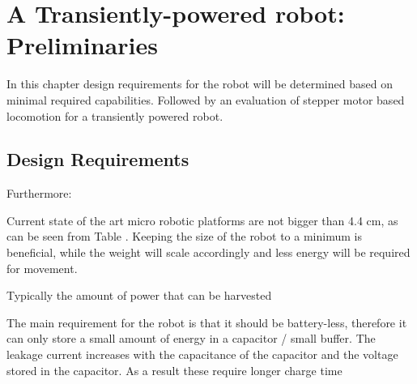 \chapter{A Transiently-powered robot: Preliminaries}

In this chapter design requirements for the robot will be determined based on minimal required capabilities. 
Followed by an evaluation of stepper motor based locomotion for a transiently powered robot.

\section{Design Requirements}
\label{sec:design_requirements}






Furthermore:



Current state of the art micro robotic platforms are not bigger than 4.4 cm, as can be seen from Table \label{tab:comparison_robot_platforms}.
Keeping the size of the robot to a minimum is beneficial, while the weight will scale accordingly and less energy will be required for movement.



Typically the amount of power that can be harvested 

The main requirement for the robot is that it should be battery-less, therefore it can only store a small amount of energy in a capacitor / small buffer.
The leakage current increases with the capacitance of the capacitor and the voltage stored in the capacitor.
As a result these require longer charge time

